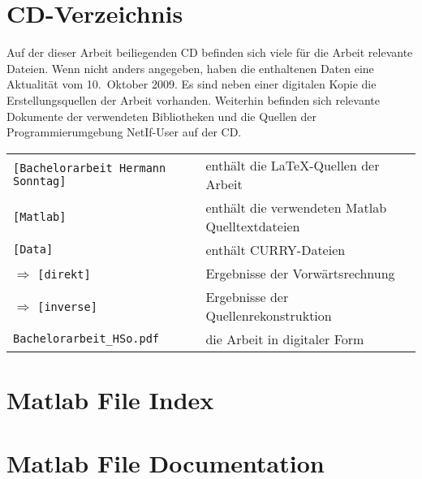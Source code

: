 \chapter{CD-Verzeichnis}
\label{anhang:cd}

Auf der dieser Arbeit beiliegenden CD befinden sich viele für die Arbeit relevante Dateien.
Wenn nicht anders angegeben, haben die enthaltenen Daten eine Aktualität vom 10.~Oktober 2009.
Es sind neben einer digitalen Kopie die Erstellungsquellen der Arbeit vorhanden. Weiterhin befinden sich relevante Dokumente der verwendeten Bibliotheken und die Quellen der Programmierumgebung NetIf-User auf der CD.

\begin{center}
	\begin{tabular}{ll}
		\texttt{[Bachelorarbeit Hermann Sonntag]}									&		enthält die \LaTeX-Quellen der Arbeit \\
		\texttt{[Matlab]}																					&		enthält die verwendeten Matlab Quelltextdateien	\\
		\texttt{[Data]}																				&		enthält CURRY-Dateien 	\\
		$\Rightarrow$ \texttt{[direkt]}										&		Ergebnisse der Vorwärtsrechnung	\\
		$\Rightarrow$ \texttt{[inverse]}	&		Ergebnisse der Quellenrekonstruktion	\\
		\texttt{Bachelorarbeit\_HSo.pdf}													&		die Arbeit in digitaler Form	\\
	\end{tabular}
\end{center}
\chapter{Matlab File Index}

\chapter{Matlab File Documentation}





